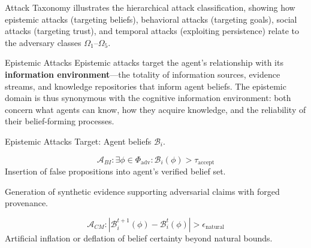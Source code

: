 \documentclass[
  ignorenonframetext,
]{beamer}
\providecommand{\Cref}[1]{\texttt{\detokenize{#1}}}
\begin{document}
\begin{frame}{Attack Taxonomy}
\Cref{fig:threat-taxonomy} illustrates the hierarchical attack
classification, showing how epistemic attacks (targeting beliefs),
behavioral attacks (targeting goals), social attacks (targeting trust),
and temporal attacks (exploiting persistence) relate to the adversary
classes \(\Omega_1\)--\(\Omega_5\).
\end{frame}

\begin{frame}[allowframebreaks]{Epistemic Attacks}
\protect{}\label{epistemic-attacks}
Epistemic attacks target the agent's relationship with its
\textbf{information environment}---the totality of information sources,
evidence streams, and knowledge repositories that inform agent beliefs.
The epistemic domain is thus synonymous with the cognitive information
environment: both concern what agents can know, how they acquire
knowledge, and the reliability of their belief-forming processes.

\end{frame}

\begin{frame}[allowframebreaks]{Epistemic Attacks}
Target: Agent beliefs \(\mathcal{B}_i\).

\begin{definition}
\label{def:belief-injection}
\begin{equation}
\label{eq:belief-injection}
\mathcal{A}_{BI}: \exists \phi \in \Phi_{\text{adv}}: \mathcal{B}_i(\phi) > \tau_{\text{accept}}
\end{equation}
Insertion of false propositions into agent's verified belief set.
\end{definition}

\begin{definition}
\label{def:evidence-fab}
Generation of synthetic evidence supporting adversarial claims with forged provenance.
\end{definition}

\begin{definition}
\label{def:confidence-manip}
\begin{equation}
\label{eq:confidence-manip}
\mathcal{A}_{CM}: |\mathcal{B}_i^{t+1}(\phi) - \mathcal{B}_i^t(\phi)| > \epsilon_{\text{natural}}
\end{equation}
Artificial inflation or deflation of belief certainty beyond natural bounds.
\end{definition}

\end{frame}
\end{document}
